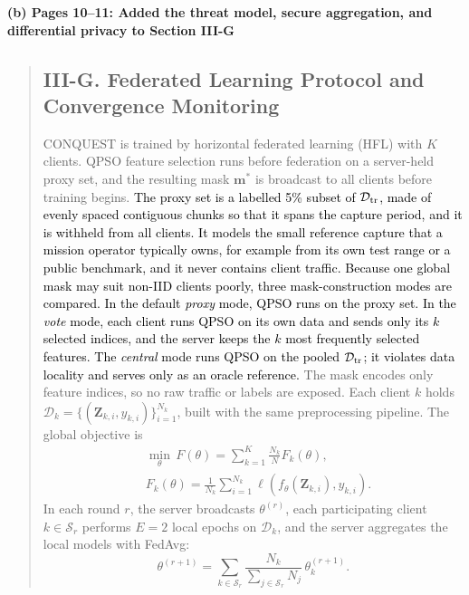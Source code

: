 \documentclass[11pt]{article}
\newenvironment{excerpt}{\begin{quote}\sloppy}{\end{quote}}
\newcommand{\mshead}[2]{\subsection*{\textbf{#1. #2}}}
\newcommand{\loc}[1]{\par\medskip\noindent\textbf{#1}\par}
\begin{document}
\loc{(b) Pages 10--11: Added the threat model, secure aggregation, and differential privacy to Section III-G}
\begin{excerpt}
\mshead{III-G}{Federated Learning Protocol and Convergence Monitoring}


CONQUEST is trained by horizontal federated learning (HFL) with $K$
clients. QPSO feature selection runs before federation on a
server-held proxy set, and the resulting mask $\mathbf{m}^{*}$ is
broadcast to all clients before training begins.
\textcolor{black}{The proxy set is a labelled 5\% subset of
$\mathcal{D}_{\rm tr}$, made of evenly spaced contiguous chunks so
that it spans the capture period, and it is withheld from all
clients. It models the small reference capture that a mission
operator typically owns, for example from its own test range or a
public benchmark, and it never contains client traffic. Because one
global mask may suit non-IID clients poorly, three mask-construction
modes are compared. In the default \textit{proxy} mode, QPSO runs on
the proxy set. In the \textit{vote} mode, each client runs QPSO on its
own data and sends only its $k$ selected indices, and the server
keeps the $k$ most frequently selected features. The
\textit{central} mode runs QPSO on the pooled $\mathcal{D}_{\rm tr}$;
it violates data locality and serves only as an oracle reference.}
The mask encodes only feature indices, so no raw traffic or labels
are exposed. Each client $k$ holds
$\mathcal{D}_k=\{(\mathbf{Z}_{k,i},y_{k,i})\}_{i=1}^{N_k}$, built with
the same preprocessing pipeline. The global objective is
\begin{equation}
\begin{aligned}
&\min_{\theta}\,F(\theta)=\sum_{k=1}^{K}\frac{N_k}{N}F_k(\theta),\\
&F_k(\theta)=\frac{1}{N_k}\sum_{i=1}^{N_k}
\ell\!\left(f_\theta(\mathbf{Z}_{k,i}),y_{k,i}\right).
\end{aligned}
\tag{19}
\end{equation}
In each round $r$, the server broadcasts $\theta^{(r)}$, each
participating client $k\in\mathcal{S}_r$ performs $E=2$ local epochs
on $\mathcal{D}_k$, and the server aggregates the local models with
FedAvg:
\begin{equation}
\theta^{(r+1)}=\sum_{k\in\mathcal{S}_r}
\frac{N_k}{\sum_{j\in\mathcal{S}_r}N_j}
\,\theta_k^{(r+1)}.
\tag{20}
\end{equation}


\end{excerpt}
\end{document}
